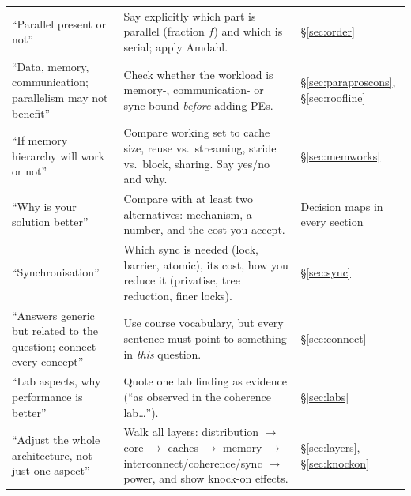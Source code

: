 \begin{longtable}{L{3.6cm}L{7.4cm}L{4.6cm}}
``Parallel present or not'' & Say explicitly which part is parallel (fraction $f$) and which is serial; apply Amdahl. & \S\ref{sec:order} \\
``Data, memory, communication; parallelism may not benefit'' & Check whether the workload is memory-, communication- or sync-bound \emph{before} adding PEs. & \S\ref{sec:paraproscons}, \S\ref{sec:roofline} \\
``If memory hierarchy will work or not'' & Compare working set to cache size, reuse vs.\ streaming, stride vs.\ block, sharing. Say yes/no and why. & \S\ref{sec:memworks} \\
``Why is your solution better'' & Compare with at least two alternatives: mechanism, a number, and the cost you accept. & Decision maps in every section \\
``Synchronisation'' & Which sync is needed (lock, barrier, atomic), its cost, how you reduce it (privatise, tree reduction, finer locks). & \S\ref{sec:sync} \\
``Answers generic but related to the question; connect every concept'' & Use course vocabulary, but every sentence must point to something in \emph{this} question. & \S\ref{sec:connect} \\
``Lab aspects, why performance is better'' & Quote one lab finding as evidence (``as observed in the coherence lab\ldots''). & \S\ref{sec:labs} \\
``Adjust the whole architecture, not just one aspect'' & Walk all layers: distribution $\rightarrow$ core $\rightarrow$ caches $\rightarrow$ memory $\rightarrow$ interconnect/coherence/sync $\rightarrow$ power, and show knock-on effects. & \S\ref{sec:layers}, \S\ref{sec:knockon} \\
\bottomrule
\end{longtable}
\normalsize


